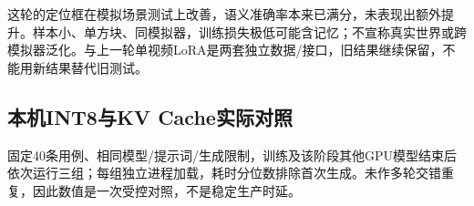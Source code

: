 
这轮的定位框在模拟场景测试上改善，语义准确率本来已满分，未表现出额外提升。样本小、单方块、同模拟器，训练损失极低可能含记忆；不宣称真实世界或跨模拟器泛化。与上一轮单视频LoRA是两套独立数据/接口，旧结果继续保留，不能用新结果替代旧测试。

\subsection{本机INT8与KV Cache实际对照}\label{s04-detail-4}

固定40条用例、相同模型/提示词/生成限制，训练及该阶段其他GPU模型结束后依次运行三组；每组独立进程加载，耗时分位数排除首次生成。未作多轮交错重复，因此数值是一次受控对照，不是稳定生产时延。

